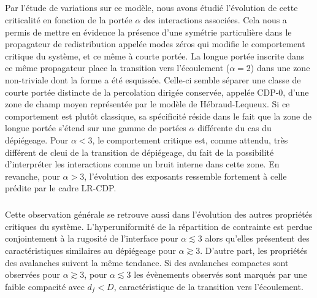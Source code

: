\subparagraph{}Par l'étude de variations sur ce modèle, nous avons étudié l'évolution de cette criticalité en fonction de la portée $\alpha$ des interactions associées. Cela nous a permis de mettre en évidence la présence d'une symétrie particulière dans le propagateur de redistribution appelée modes zéros qui modifie le comportement critique du système, et ce même à courte portée. La longue portée inscrite dans ce même propagateur place la transition vers l'écoulement ($\alpha = 2$) dans une zone non-triviale dont la forme a été esquissée. Celle-ci semble séparer une classe de courte portée distincte de la percolation dirigée conservée, appelée CDP-0, d'une zone de champ moyen représentée par le modèle de Hébraud-Lequeux. Si ce comportement est plutôt classique, sa spécificité réside dans le fait que la zone de longue portée s'étend sur une gamme de portées $\alpha$ différente du cas du dépiégeage. Pour $\alpha < 3$, le comportement critique est, comme attendu, très différent de cleui de la transition de dépiégeage, du fait de la possibilité d'interpréter les interactions comme un bruit interne dans cette zone. En revanche, pour $\alpha > 3$, l'évolution des exposants ressemble fortement à celle prédite par le cadre LR-CDP.

\subparagraph{}Cette observation générale se retrouve aussi dans l'évolution des autres propriétés critiques du système. L'hyperuniformité de la répartition de contrainte est perdue conjointement à la rugosité de l'interface pour $\alpha\lesssim 3$ alors qu'elles présentent des caractéristiques similaires au dépiégeage pour $\alpha\gtrsim 3$. D'autre part, les propriétés des avalanches suivent la même tendance. Si des avalanches compactes sont observées pour $\alpha\gtrsim 3$, pour $\alpha\lesssim 3$ les évènements observés sont marqués par une faible compacité avec $d_f < D$, caractéristique de la transition vers l'écoulement. 
